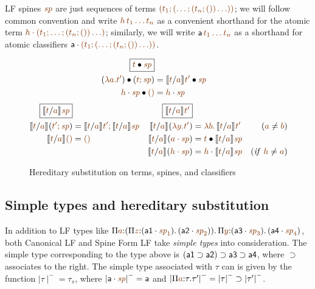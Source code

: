LF spines $\lf\spi$ are just sequences of terms $\lf{(t_1; (\ldots;
  (t_n;())\ldots))}$; we will follow common convention and write
$\lf{h\,t_1\ldots t_n}$ as a convenient shorthand for the atomic term
$\lf{\lfroot{h}{(t_1; \ldots; (t_n;())\ldots)}}$; similarly, we will
write ${\sf a}\,\lf{t_1\ldots t_n}$ as a shorthand for atomic
classifiers $\lfroot{\sf a}{(t_1;
  (\ldots; (t_n;())\ldots))}$. %

\begin{figure}[t]
\begin{align*}
\fbox{$\subst{\lf{t}}{\lf{\spi}}$}
\\
\subst{(\lf{\lambda a. t'})}{(\lf{t; \spi})}
 & = \subst{\rsubst{\lf{t}}{\lf{a}}{\lf{t'}}}{\lf{\spi}}
\\
\subst{\lfroot{\lf h}{\spi}}{\lfnil}
 & = \lfroot{\lf h}{\spi}
\end{align*}\begin{align*}
\fbox{$\rsubst{\lf{t}}{\lf{a}}{\lf{\spi}}$}&
&
\fbox{$\rsubst{\lf{t}}{\lf{a}}{\lf{t'}}$}&
&
\\
\rsubst{\lf t}{\lf a}{(\lf{t'; \spi})}
 & = \lf{\no{\rsubst{\lf t}{\lf a}{\lf{t'}}}; 
         \no{\rsubst{\lf t}{\lf a}{\lf{\spi}}}} &
\rsubst{\lf t}{\lf a}(\lf{\lambda y. t'})
 & = \lf{\lambda b.\, \no{\rsubst{\lf t}{\lf a}{\lf{t'}}}} 
      & (\lf a \neq \lf b) 
\\
\rsubst{\lf t}{\lf a}{\lfnil} 
 & = \lfnil &
\rsubst{\lf t}{\lf a}{(\lf{\lfroot{a}{\spi}})}
 & = \subst{\lf t}{\rsubst{\lf t}{\lf a}{\lf{\spi}}}
\\
& & 
\rsubst{\lf t}{\lf a}{(\lf{\lfroot{h}{\spi}})}
 & = \lfroot{\lf h}{\no{\rsubst{\lf t}{\lf a}{\lf{\spi}}}}
      & ({\it if}~ \lf{h} \neq \lf{a})
\end{align*}
\caption{Hereditary substitution on terms, spines, and classifiers}
\label{fig:lf-hsubst}
\end{figure}

\subsection{Simple types and hereditary substitution}

In addition to LF types like $\lfpi{a}{(\lfpi{z}{(\lfroot{\sf
      a1}{\spi_1})}{\,(\lfroot{\sf
      a2}{\spi_2})})}{\,\lfpi{y}{(\lfroot{\sf
      a3}{\spi_3})}{\,(\lfroot{\sf a4}{\spi_4})}}$, both Canonical LF
and Spine Form LF take {\it simple types} into consideration. The
simple type corresponding to the type above is $({\sf a1} \supset {\sf
  a2}) \supset {\sf a3} \supset {\sf a4}$, where ${\supset}$
associates to the right. The simple type associated with
$\tau$ can is given by the function ${\mid}\tau{\mid}^- = \tau_s$, where
${\mid}\lfroot{\sf a}{\spi}{\mid}^- = {\sf a}$ and
${\mid}\lfpi{a}{\tau}{\tau'}{\mid}^- = {\mid}\tau{\mid}^- \supset
{\mid}\tau'{\mid}^-$. 


